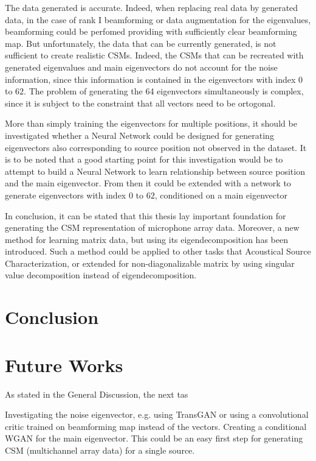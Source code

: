 \documentclass[11pt,a4paper,twoside]{report}
\begin{document}
The data generated is accurate. Indeed, when replacing real data by generated data, in the case of rank I beamforming or data augmentation for the eigenvalues, beamforming could be perfomed providing with sufficiently clear beamforming map. But unfortunately, the data that can be currently generated, is not sufficient to create realistic CSMs. Indeed, the CSMs that can be recreated with generated eigenvalues and main eigenvectors do not account for the noise information, since this information is contained in the eigenvectors with index $0$ to $62$. The problem of generating the 64 eigenvectors simultaneously is complex, since it is subject to the constraint that all vectors need to be ortogonal. 

More than simply training the eigenvectors for multiple positions, it should be investigated whether a Neural Network could be designed for generating eigenvectors also corresponding to source position not observed in the dataset. It is to be noted that a good starting point for this investigation would be to attempt to build a Neural Network to learn relationship between source position and the main eigenvector. From then it could be extended with a network to generate eigenvectors with index $0$ to $62$, conditioned on a main eigenvector 

In conclusion, it can be stated that this thesis lay important foundation for generating the CSM representation of microphone array data. Moreover, a new method for learning matrix data, but using its eigendecomposition has been introduced. Such a method could be applied to other tasks that Acoustical Source Characterization, or extended for non-diagonalizable matrix by using singular value decomposition instead of eigendecomposition.

\chapter{Conclusion}

\chapter{Future Works}

As stated in the General Discussion, the next tas 


Investigating the noise eigenvector, e.g. using TransGAN or using a convolutional critic trained on beamforming map instead of the vectors.
Creating a conditional WGAN for the main eigenvector. This could be an easy first step for generating CSM (multichannel array data) for a single source.
\end{document}
